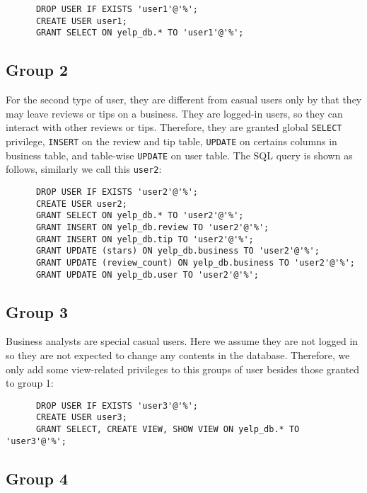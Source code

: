 \documentclass[12pt]{scrbook}
\begin{document}
    \begin{verbatim}
      DROP USER IF EXISTS 'user1'@'%';
      CREATE USER user1;
      GRANT SELECT ON yelp_db.* TO 'user1'@'%';
    \end{verbatim}
  
\subsection{Group 2}

    For the second type of user, they are different from casual users only by that they may leave reviews or tips on a business. They are logged-in users, so they can interact with other reviews or tips. Therefore, they are granted global \texttt{SELECT} privilege, \texttt{INSERT} on the review and tip table, \texttt{UPDATE} on certains columns in business table, and table-wise \texttt{UPDATE} on user table. The SQL query is shown as follows, similarly we call this \texttt{user2}:

    \begin{verbatim}
      DROP USER IF EXISTS 'user2'@'%';
      CREATE USER user2;
      GRANT SELECT ON yelp_db.* TO 'user2'@'%';
      GRANT INSERT ON yelp_db.review TO 'user2'@'%';
      GRANT INSERT ON yelp_db.tip TO 'user2'@'%';
      GRANT UPDATE (stars) ON yelp_db.business TO 'user2'@'%';
      GRANT UPDATE (review_count) ON yelp_db.business TO 'user2'@'%';
      GRANT UPDATE ON yelp_db.user TO 'user2'@'%';
    \end{verbatim}

\subsection{Group 3}

    Business analysts are special casual users. Here we assume they are not logged in so they are not expected to change any contents in the database. Therefore, we only add some view-related privileges to this groups of user besides those granted to group 1:

    \begin{verbatim}
      DROP USER IF EXISTS 'user3'@'%';
      CREATE USER user3;
      GRANT SELECT, CREATE VIEW, SHOW VIEW ON yelp_db.* TO 'user3'@'%';
    \end{verbatim}

\subsection{Group 4}
\end{document}
